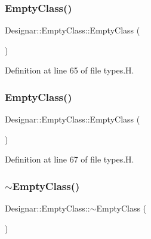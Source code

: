 \subsubsection{\texorpdfstring{Empty\+Class()}{EmptyClass()}\hspace{0.1cm}{\footnotesize\ttfamily [2/3]}}
{\footnotesize\ttfamily Designar\+::\+Empty\+Class\+::\+Empty\+Class (\begin{DoxyParamCaption}\item[{const \hyperlink{class_designar_1_1_empty_class}{Empty\+Class} \&}]{ }\end{DoxyParamCaption})\hspace{0.3cm}{\ttfamily [inline]}}



Definition at line 65 of file types.\+H.

\mbox{\label{class_designar_1_1_empty_class_aa18e6ee1ae08bc9500c9c0f91a6bae0c}} 
\subsubsection{\texorpdfstring{Empty\+Class()}{EmptyClass()}\hspace{0.1cm}{\footnotesize\ttfamily [3/3]}}
{\footnotesize\ttfamily Designar\+::\+Empty\+Class\+::\+Empty\+Class (\begin{DoxyParamCaption}\item[{\hyperlink{class_designar_1_1_empty_class}{Empty\+Class} \&\&}]{ }\end{DoxyParamCaption})\hspace{0.3cm}{\ttfamily [inline]}}



Definition at line 67 of file types.\+H.

\mbox{\label{class_designar_1_1_empty_class_a751a2dca8e5df75e3f6a528f4fa43656}} 
\subsubsection{\texorpdfstring{$\sim$\+Empty\+Class()}{~EmptyClass()}}
{\footnotesize\ttfamily Designar\+::\+Empty\+Class\+::$\sim$\+Empty\+Class (\begin{DoxyParamCaption}{ }\end{DoxyParamCaption})\hspace{0.3cm}{\ttfamily [inline]}}



